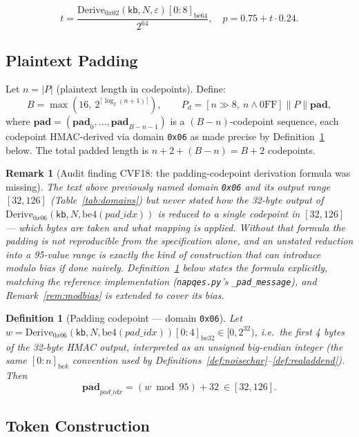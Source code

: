 \documentclass[11pt,a4paper]{article}
\newtheorem{definition}[theorem]{Definition}
\newtheorem{remark}[theorem]{Remark}
\begin{document}
\[
  t = \frac{\mathrm{Derive}_{0x02}(\mathsf{kb}, N, \varepsilon)[0:8]_{\mathrm{be64}}}{2^{64}},
  \quad
  p = 0.75 + t \cdot 0.24.
\]

\subsection{Plaintext Padding}

Let $n = \lvert P \rvert$ (plaintext length in codepoints).  Define:
\[
  B = \max(16,\ 2^{\lceil \log_2(n+1) \rceil}), \qquad P_d = [n \gg 8,\ n \wedge 0\mathrm{FF}] \| P \| \mathbf{pad},
\]
where $\mathbf{pad} = (\mathbf{pad}_0, \ldots, \mathbf{pad}_{B-n-1})$ is a
$(B - n)$-codepoint sequence, each codepoint HMAC-derived via domain
\texttt{0x06} as made precise by Definition~\ref{def:padcodepoint} below.
The total padded length is $n + 2 + (B - n) = B + 2$ codepoints.

\begin{remark}[Audit finding CVF18: the padding-codepoint derivation formula was missing]
\label{rem:cvf18}
The text above previously named domain \texttt{0x06} and its output range
$[32,126]$ (Table~\ref{tab:domains}) but never stated how the 32-byte
output of $\mathrm{Derive}_{0x06}(\mathsf{kb}, N, \mathrm{be4}(pad\_idx))$
is reduced to a single codepoint in $[32,126]$ --- which bytes are taken
and what mapping is applied. Without that formula the padding is not
reproducible from the specification alone, and an unstated reduction into
a 95-value range is exactly the kind of construction that can introduce
modulo bias if done naively. Definition~\ref{def:padcodepoint} below
states the formula explicitly, matching the reference implementation
(\texttt{napqes.py}'s \texttt{\_pad\_message}), and Remark~\ref{rem:modbias}
is extended to cover its bias.
\end{remark}

\begin{definition}[Padding codepoint --- domain \texttt{0x06}]
\label{def:padcodepoint}
Let $w = \mathrm{Derive}_{0x06}(\mathsf{kb}, N, \mathrm{be4}(pad\_idx))[0{:}4]_{\mathrm{be32}} \in [0, 2^{32})$,
i.e.\ the first 4 bytes of the 32-byte HMAC output, interpreted as an
unsigned big-endian integer (the same $[0{:}n]_{\mathrm{be}k}$ convention
used by Definitions~\ref{def:noisechar}--\ref{def:realaddend}). Then
\[
  \mathbf{pad}_{pad\_idx} = (w \bmod 95) + 32 \ \in [32, 126].
\]
\end{definition}

\subsection{Token Construction}
\end{document}
